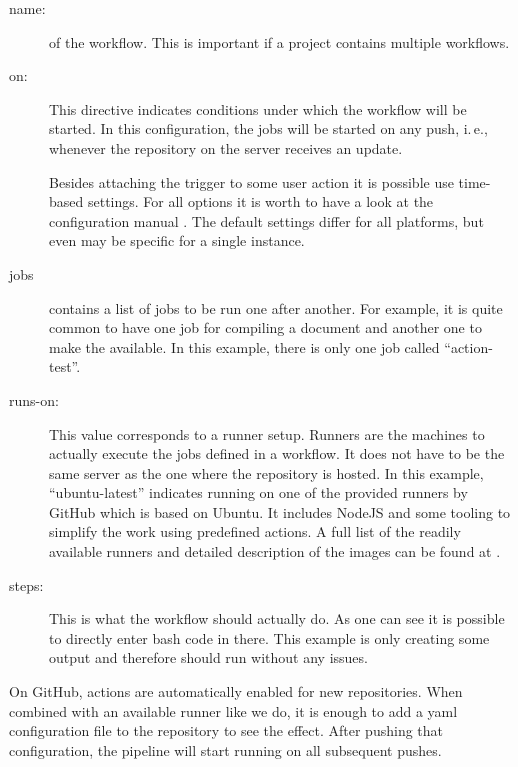 \documentclass[final]{ltugboat}
\begin{document}
\begin{description}
\item[name:] of the workflow.
This is important if a project contains multiple workflows.

\item[on:] This directive indicates conditions under which the workflow will be started.
In this configuration, the jobs will be started on any push, i.\,e., whenever the repository on the server receives an update.

Besides attaching the trigger to some user action it is possible use time-based settings.
For all options it is worth to have a look at the configuration manual \cite{github-actions-ref}.
The default settings differ for all platforms, but even may be specific for a single instance.

\item[jobs] contains a list of jobs to be run one after another.
For example, it is quite common to have one job for compiling a document and another one to make the  available.
In this example, there is only one job called \enquote{action-test}.

\item[runs-on:] This value corresponds to a runner setup.
Runners are the machines to actually execute the jobs defined in a workflow.
It does not have to be the same server as the one where the repository is hosted.
In this example, \enquote{ubuntu-latest} indicates running on one of the provided runners by GitHub which is based on Ubuntu.
It includes NodeJS and some tooling to simplify the work using predefined actions.
A full list of the readily available runners and detailed description of the images can be found at \cite{github-hosted-runners}.

\item[steps:] This is what the workflow should actually do.
As one can see it is possible to directly enter bash code in there.
This example is only creating some output and therefore should run without any issues.
\end{description}

On GitHub, actions are automatically enabled for new repositories.
When combined with an available runner like we do, it is enough to add a yaml configuration file to the repository to see the effect.
After pushing that configuration, the pipeline will start running on all subsequent pushes.
\end{document}
